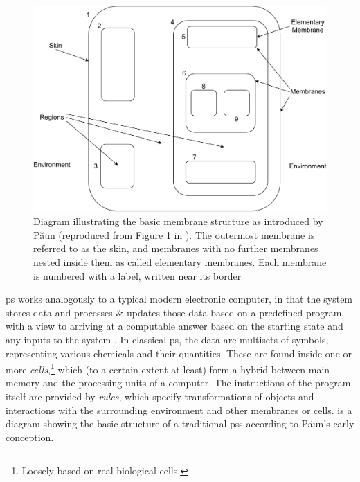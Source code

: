 \begin{figure}
    \centering
    \includegraphics[width=1.0\textwidth]{chapters/background/images/membranestructure.pdf}
    \caption[Diagram illustrating the basic membrane structure as introduced by Păun]{Diagram illustrating the basic membrane structure as introduced by Păun (reproduced from Figure 1 in \cite{Paun2006}).  The outermost membrane is referred to as the skin, and membranes with no further membranes nested inside them as called elementary membranes.  Each membrane is numbered with a label, written near its border}
    \label{fig:back:membranestructure}
\end{figure}

\Gls{ps} works analogously to a typical modern electronic computer, in that the system stores data and processes \& updates those data based on a predefined program, with a view to arriving at a computable answer based on the starting state and any inputs to the system \cite{Paun2002,Paun2010b}.  In classical \gls{ps}, the data are multisets of symbols, representing various chemicals and their quantities.  These are found inside one or more \emph{cells},\footnote{Loosely based on real biological cells.} which (to a certain extent at least) form a hybrid between main memory and the processing units of a computer.  The instructions of the program itself are provided by \emph{rules}, which specify transformations of objects and interactions with the surrounding environment and other membranes or cells.   is a diagram showing the basic structure of a traditional \glspl{ps} according to Păun's early conception.

